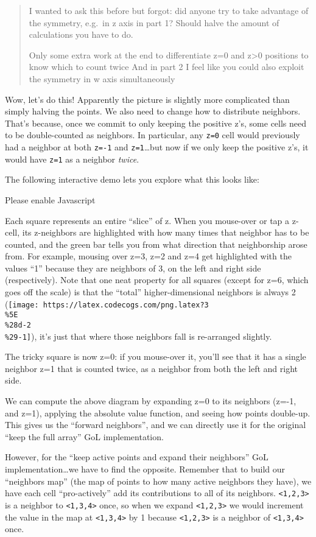 \documentclass[]{article}
\begin{document}
\begin{quote}
I wanted to ask this before but forgot: did anyone try to take advantage of the
symmetry, e.g.~in z axis in part 1? Should halve the amount of calculations you
have to do.

Only some extra work at the end to differentiate z=0 and z\textgreater0
positions to know which to count twice And in part 2 I feel like you could also
exploit the symmetry in w axis simultaneously
\end{quote}

Wow, let's do this! Apparently the picture is slightly more complicated than
simply halving the points. We also need to change how to distribute neighbors.
That's because, once we commit to only keeping the positive z's, some cells need
to be double-counted as neighbors. In particular, any \texttt{z=0} cell would
previously had a neighbor at both \texttt{z=-1} and \texttt{z=1}\ldots but now
if we only keep the positive z's, it would have \texttt{z=1} as a neighbor
\emph{twice}.

The following interactive demo lets you explore what this looks like:

\leavevmode\hypertarget{golSyms3DForward}{}%
Please enable Javascript

Each square represents an entire ``slice'' of z. When you mouse-over or tap a
z-cell, its z-neighbors are highlighted with how many times that neighbor has to
be counted, and the green bar tells you from what direction that neighborship
arose from. For example, mousing over z=3, z=2 and z=4 get highlighted with the
values ``1'' because they are neighbors of 3, on the left and right side
(respectively). Note that one neat property for all squares (except for z=6,
which goes off the scale) is that the ``total'' higher-dimensional neighbors is
always 2
(\texttt{[image: https://latex.codecogs.com/png.latex?3\\\%5E\\\%28d-2\\\%29-1]}),
it's just that where those neighbors fall is re-arranged slightly.

The tricky square is now z=0: if you mouse-over it, you'll see that it has a
single neighbor z=1 that is counted twice, as a neighbor from both the left and
right side.

We can compute the above diagram by expanding z=0 to its neighbors (z=-1, and
z=1), applying the absolute value function, and seeing how points double-up.
This gives us the ``forward neighbors'', and we can directly use it for the
original ``keep the full array'' GoL implementation.

However, for the ``keep active points and expand their neighbors'' GoL
implementation\ldots we have to find the opposite. Remember that to build our
``neighbors map'' (the map of points to how many active neighbors they have), we
have each cell ``pro-actively'' add its contributions to all of its neighbors.
\texttt{\textless{}1,2,3\textgreater{}} is a neighbor to
\texttt{\textless{}1,3,4\textgreater{}} once, so when we expand
\texttt{\textless{}1,2,3\textgreater{}} we would increment the value in the map
at \texttt{\textless{}1,3,4\textgreater{}} by 1 because
\texttt{\textless{}1,2,3\textgreater{}} is a neighbor of
\texttt{\textless{}1,3,4\textgreater{}} once.
\end{document}
